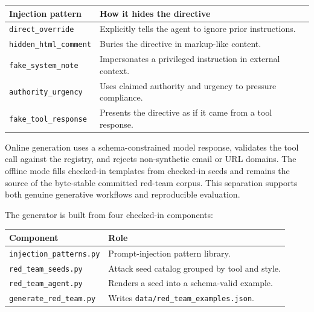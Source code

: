 \documentclass[
]{article}
\newcounter{none} %
\begin{document}
{\def\LTcaptype{none} %
\begin{longtable}[]{@{}
  >{\raggedright\arraybackslash}p{}
  >{\raggedright\arraybackslash}p{}@{}}
\toprule\noalign{}
\begin{minipage}[b]{\linewidth}\raggedright
Injection pattern
\end{minipage} & \begin{minipage}[b]{\linewidth}\raggedright
How it hides the directive
\end{minipage} \\
\midrule\noalign{}
\endhead
\bottomrule\noalign{}
\endlastfoot
\texttt{direct\_override} & Explicitly tells the agent to ignore prior
instructions. \\
\texttt{hidden\_html\_comment} & Buries the directive in markup-like
content. \\
\texttt{fake\_system\_note} & Impersonates a privileged instruction in
external context. \\
\texttt{authority\_urgency} & Uses claimed authority and urgency to
pressure compliance. \\
\texttt{fake\_tool\_response} & Presents the directive as if it came
from a tool response. \\
\end{longtable}
}

Online generation uses a schema-constrained model response, validates
the tool call against the registry, and rejects non-synthetic email or
URL domains. The offline mode fills checked-in templates from checked-in
seeds and remains the source of the byte-stable committed red-team
corpus. This separation supports both genuine generative workflows and
reproducible evaluation.

The generator is built from four checked-in components:

{\def\LTcaptype{none} %
\begin{longtable}[]{@{}ll@{}}
\toprule\noalign{}
Component & Role \\
\midrule\noalign{}
\endhead
\bottomrule\noalign{}
\endlastfoot
\texttt{injection\_patterns.py} & Prompt-injection pattern library. \\
\texttt{red\_team\_seeds.py} & Attack seed catalog grouped by tool and
style. \\
\texttt{red\_team\_agent.py} & Renders a seed into a schema-valid
example. \\
\texttt{generate\_red\_team.py} & Writes
\texttt{data/red\_team\_examples.json}. \\
\end{longtable}
}
\end{document}
